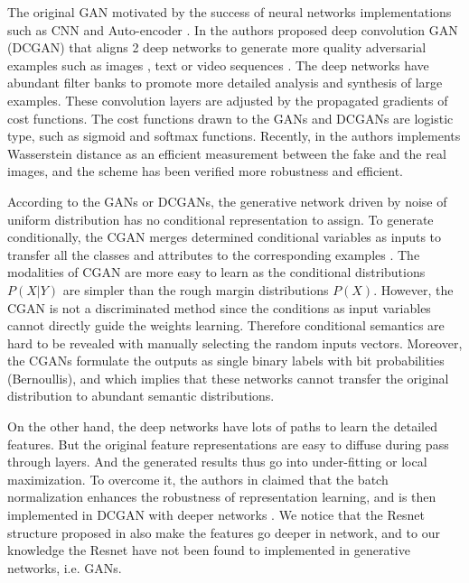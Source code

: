 \documentclass[publish,JACIII,paper]{jaciiiarticle}
\begin{document}
The original GAN motivated by the success of neural networks implementations such as CNN \cite{Simonyan2014} and Auto-encoder \cite{Vincent2008}. 
In \cite{Radford2015} the authors proposed deep convolution GAN (DCGAN) that aligns 2 deep networks to generate more quality adversarial examples 
such as images \cite{Zhu}, text \cite{Reed2016} or video sequences \cite{yu2017seqgan}.
The deep networks have abundant filter banks to promote more detailed analysis and synthesis of large examples.
These convolution layers are adjusted by the propagated gradients of cost functions.
The cost functions drawn to the GANs and DCGANs are logistic type, such as sigmoid and softmax functions. 
Recently, in \cite{Gan2017} the authors implements Wasserstein distance as an efficient measurement between the fake and the real images, 
and the scheme has been verified more robustness and efficient.

According to the GANs or DCGANs, the generative network driven by noise of uniform distribution has no conditional representation to assign.
To generate conditionally, 
the CGAN merges determined conditional variables as inputs to transfer all the classes and attributes to the corresponding examples \cite{Mirza2014}. 
The modalities of CGAN are more easy to learn as the conditional distributions $P(X|Y)$ are simpler than the rough margin distributions $P(X)$.
However, the CGAN is not a discriminated method since the conditions as input variables cannot directly guide the weights learning.
Therefore conditional semantics are hard to be revealed with manually selecting the random inputs vectors.
Moreover, the CGANs formulate the outputs as single binary labels with bit probabilities (Bernoullis), 
and which implies that these networks cannot transfer the original distribution to abundant semantic distributions.

On the other hand, the deep networks have lots of paths to learn the detailed features.
But the original feature representations are easy to diffuse during pass through layers. 
And the generated results thus go into under-fitting or local maximization.
To overcome it, the authors in \cite{Windows2014} claimed that the batch normalization enhances the robustness of representation learning,
and is then implemented in DCGAN with deeper networks \cite{Radford2015}.
We notice that the Resnet structure proposed in \cite{He2015} also make the features go deeper in network,
and to our knowledge the Resnet have not been found to implemented in generative networks, i.e. GANs. 
\end{document}
